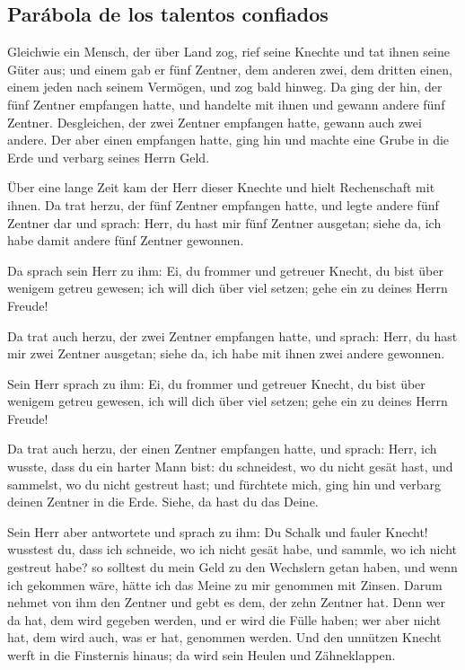 \hypertarget{paruxe1bola-de-los-talentos-confiados}{%
\subsection{Parábola de los talentos
confiados}\label{paruxe1bola-de-los-talentos-confiados}}

 Gleichwie ein Mensch, der über Land zog, rief seine
Knechte und tat ihnen seine Güter aus;  und einem gab er
fünf Zentner, dem anderen zwei, dem dritten einen, einem jeden nach
seinem Vermögen, und zog bald hinweg.  Da ging der hin,
der fünf Zentner empfangen hatte, und handelte mit ihnen und gewann
andere fünf Zentner.  Desgleichen, der zwei Zentner
empfangen hatte, gewann auch zwei andere.  Der aber einen
empfangen hatte, ging hin und machte eine Grube in die Erde und verbarg
seines Herrn Geld.

 Über eine lange Zeit kam der Herr dieser Knechte und
hielt Rechenschaft mit ihnen.  Da trat herzu, der fünf
Zentner empfangen hatte, und legte andere fünf Zentner dar und sprach:
Herr, du hast mir fünf Zentner ausgetan; siehe da, ich habe damit andere
fünf Zentner gewonnen.

 Da sprach sein Herr zu ihm: Ei, du frommer und getreuer
Knecht, du bist über wenigem getreu gewesen; ich will dich über viel
setzen; gehe ein zu deines Herrn Freude!

 Da trat auch herzu, der zwei Zentner empfangen hatte,
und sprach: Herr, du hast mir zwei Zentner ausgetan; siehe da, ich habe
mit ihnen zwei andere gewonnen.

 Sein Herr sprach zu ihm: Ei, du frommer und getreuer
Knecht, du bist über wenigem getreu gewesen, ich will dich über viel
setzen; gehe ein zu deines Herrn Freude!

 Da trat auch herzu, der einen Zentner empfangen hatte,
und sprach: Herr, ich wusste, dass du ein harter Mann bist: du
schneidest, wo du nicht gesät hast, und sammelst, wo du nicht gestreut
hast;  und fürchtete mich, ging hin und verbarg deinen
Zentner in die Erde. Siehe, da hast du das Deine.

 Sein Herr aber antwortete und sprach zu ihm: Du Schalk
und fauler Knecht! wusstest du, dass ich schneide, wo ich nicht gesät
habe, und sammle, wo ich nicht gestreut habe?  so
solltest du mein Geld zu den Wechslern getan haben, und wenn ich
gekommen wäre, hätte ich das Meine zu mir genommen mit Zinsen.
 Darum nehmet von ihm den Zentner und gebt es dem, der
zehn Zentner hat.  Denn wer da hat, dem wird gegeben
werden, und er wird die Fülle haben; wer aber nicht hat, dem wird auch,
was er hat, genommen werden.  Und den unnützen Knecht
werft in die Finsternis hinaus; da wird sein Heulen und Zähneklappen.

